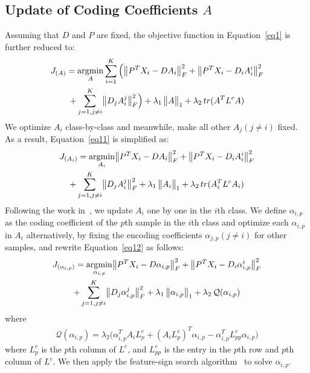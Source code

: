 \documentclass[journal]{IEEEtran}
\DeclareMathOperator*{\argmin}{\arg\!\min}
\DeclarePairedDelimiter\norm{\lVert}{\rVert}
\begin{document}
\subsection{Update of Coding Coefficients $A$}
Assuming that $D$ and $P$ are fixed, the objective function in Equation~\eqref{eq1} is further reduced to:
\begin{gather}
J_{(A)} = \argmin_{A}  \sum\limits_{i=1}^K \Big( \norm[\big]{P^T X_i - D A_i}_{F}^2 + \norm[\big]{P^T X_i - D_i A_i^i}_{F}^2
\label{eq11} \\ \notag
+ \sum_{\substack{j=1, j \neq i}}^K \norm[\big]{D_j A_i^j}_{F}^2 \Big) +  \lambda_{1} \, \norm[\big]{A}_{1} + \lambda_{2} \, tr(A^T L^c A) 
\end{gather}
We optimize $A_i$ class-by-class and meanwhile, make all other $A_j (j \neq i)$ fixed. As a result, Equation~\eqref{eq11} is simplified as:
\begin{gather}
J_{(A_i)} = \argmin_{A_i}  \norm[\big]{P^T X_i - D A_i}_{F}^2 + \norm[\big]{P^T X_i - D_i A_i^i}_{F}^2
\label{eq12} \\ \notag
+ \sum_{\substack{j=1, j \neq i}}^K \norm[\big]{D_j A_i^j}_{F}^2 +  \lambda_{1} \, \norm[\big]{A_i}_{1} + \lambda_{2} \, tr(A_i^T L^c A_i) 
\end{gather}
Following the work in~\cite{Feature-Sign}, we update $A_i$ one by one in the $i$th class. We define $\alpha_{i,p}$ as the coding coefficient of the $p$th sample in the $i$th class and optimize each $\alpha_{i,p}$ in $A_i$ alternatively, by fixing the encoding coefficients $\alpha_{j,p} (j \neq i)$ for other samples, and rewrite Equation~\eqref{eq12} as follows:
\begin{gather}
J_{(\alpha_{i,p})} = \argmin_{\alpha_{i,p}}  \norm[\big]{P^T X_i - D \alpha_{i,p}}_{F}^2 + \norm[\big]{P^T X_i - D_i \alpha_{i,p}^i}_{F}^2
\label{eq13} \\ \notag
+ \sum_{\substack{j=1, j \neq i}}^K \norm[\big]{D_j \alpha_{i,p}^j}_{F}^2 +  \lambda_{1} \, \norm[\big]{\alpha_{i,p}}_{1} + \lambda_{2} \, \mathcal Q(\alpha_{i,p})  
\end{gather}
where 
\begin{gather}
\mathcal Q(\alpha_{i,p}) = \lambda_{2} \Big(  \alpha_{i,p}^T A_i 	 L_p^c + (A_i  L_p^c )^T \alpha_{i,p} -  \alpha_{i,p}^T  L^c_{pp}  \alpha_{i,p} \Big)
\label{eq14}
\end{gather}
where $ L^c_p$ is the $p$th column of $L^c$, and $L^c_{pp}$ is the entry in the $p$th row and $p$th column of $L^c$. We then apply the feature-sign search algorithm~\cite{Feature-Sign} to solve $\alpha_{i,p}$.
\end{document}
